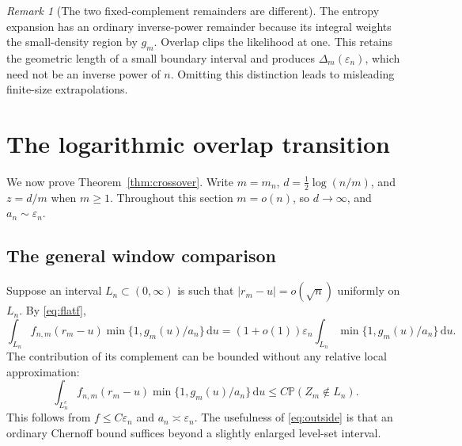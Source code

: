 \documentclass[11pt,a4paper]{article}
\numberwithin{equation}{section}
\theoremstyle{definition}
\theoremstyle{remark}
\newtheorem{remark}[theorem]{Remark}
\newcommand{\Pp}{\mathbb P}
\newcommand{\eps}{\varepsilon}
\newcommand{\dd}{\mathrm d}
\begin{document}
\begin{remark}[The two fixed-complement remainders are different]
The entropy expansion has an ordinary inverse-power remainder because
its integral weights the small-density region by $g_m$. Overlap clips
the likelihood at one. This retains the geometric length of a small
boundary interval and produces $\Delta_m(\eps_n)$, which need not be an
inverse power of $n$. Omitting this distinction leads to misleading
finite-size extrapolations.
\end{remark}

\section{The logarithmic overlap transition}
\label{sec:crossover}

We now prove Theorem~\ref{thm:crossover}. Write $m=m_n$,
$d=\tfrac12\log(n/m)$, and $z=d/m$ when $m\ge1$. Throughout this section
$m=o(n)$, so $d\to\infty$, and $a_n\sim\eps_n$.

\subsection{The general window comparison}
Suppose an interval $L_n\subset(0,\infty)$ is such that
$|r_m-u|=o(\sqrt n)$ uniformly on $L_n$. By
\eqref{eq:flatf},
\begin{equation}\label{eq:window}
\int_{L_n} f_{n,m}(r_m-u)
      \min\{1,g_m(u)/a_n\}\,\dd u
 =(1+o(1))\eps_n\int_{L_n}\min\{1,g_m(u)/a_n\}\,\dd u.
\end{equation}
The contribution of its complement can be bounded without any relative
local approximation:
\begin{equation}\label{eq:outside}
\int_{L_n^c}f_{n,m}(r_m-u)\min\{1,g_m(u)/a_n\}\,\dd u
 \le C\Pp(Z_m\notin L_n).
\end{equation}
This follows from $f\le C\eps_n$ and $a_n\asymp\eps_n$.
The usefulness of \eqref{eq:outside} is that an ordinary Chernoff bound
suffices beyond a slightly enlarged level-set interval.
\end{document}
